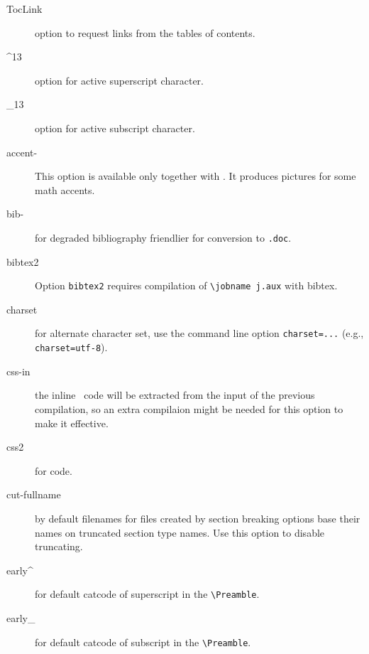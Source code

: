 \begin{description}
\item[TocLink] option to request links from the tables of contents.
  
\item[\textasciicircum 13] option for active superscript character.

\item[\_13] option for active subscript character.

\item[accent-] This option is available only together with
  . It produces pictures for some math accents.


\item[bib-] for degraded bibliography friendlier for conversion to
  \verb=.doc=.

\item[bibtex2] Option \verb=bibtex2= requires compilation of
  \verb=\jobname j.aux= with bibtex.


\item[charset] for alternate character set, use the command line
  option \verb+charset=...+ (e.g., \verb+charset=utf-8+).


\item[css-in] the inline \css\ code will be extracted from the input of
  the previous compilation, so an extra compilaion might be needed for
  this option to make it effective.

\item[css2] for  code.


\item[cut-fullname] by default filenames for files created by section breaking
  options base their names on truncated section type names. Use this option to
  disable truncating.

\item[early\textasciicircum] for default catcode of superscript in the
  \verb=\Preamble=.

\item[early\_] for default catcode of subscript in the
  \verb=\Preamble=.


\end{description}
